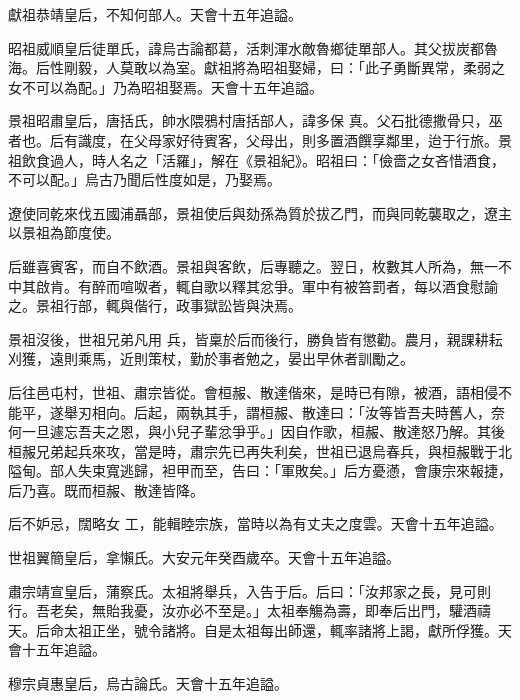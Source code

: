 \begin{pinyinscope}
 獻祖恭靖皇后，不知何部人。天會十五年追謚。



 昭祖威順皇后徒單氏，諱烏古論都葛，活刺渾水敵魯鄉徒單部人。其父拔炭都魯海。后性剛毅，人莫敢以為室。獻祖將為昭祖娶婦，曰：「此子勇斷異常，柔弱之女不可以為配。」乃為昭祖娶焉。天會十五年追謚。



 景祖昭肅皇后，唐括氏，帥水隈鴉村唐括部人，諱多保
 真。父石批德撒骨只，巫者也。后有識度，在父母家好待賓客，父母出，則多置酒饌享鄰里，迨于行旅。景祖飲食過人，時人名之「活羅」，解在《景祖紀》。昭祖曰：「儉嗇之女吝惜酒食，不可以配。」烏古乃聞后性度如是，乃娶焉。



 遼使同乾來伐五國浦聶部，景祖使后與劾孫為質於拔乙門，而與同乾襲取之，遼主以景祖為節度使。



 后雖喜賓客，而自不飲酒。景祖與客飲，后專聽之。翌日，枚數其人所為，無一不中其啟肯。有醉而喧呶者，輒自歌以釋其忿爭。軍中有被笞罰者，每以酒食慰諭之。景祖行部，輒與偕行，政事獄訟皆與決焉。



 景祖沒後，世祖兄弟凡用
 兵，皆稟於后而後行，勝負皆有懲勸。農月，親課耕耘刈獲，遠則乘馬，近則策杖，勤於事者勉之，晏出早休者訓勵之。



 后往邑屯村，世祖、肅宗皆從。會桓赧、散達偕來，是時已有隙，被酒，語相侵不能平，遂舉刃相向。后起，兩執其手，謂桓赧、散達曰：「汝等皆吾夫時舊人，奈何一旦遽忘吾夫之恩，與小兒子輩忿爭乎。」因自作歌，桓赧、散達怒乃解。其後桓赧兄弟起兵來攻，當是時，肅宗先已再失利矣，世祖已退烏春兵，與桓赧戰于北隘甸。部人失束寬逃歸，袒甲而至，告曰：「軍敗矣。」后方憂懣，會康宗來報捷，后乃喜。既而桓赧、散達皆降。



 后不妒忌，闊略女
 工，能輯睦宗族，當時以為有丈夫之度雲。天會十五年追謚。



 世祖翼簡皇后，拿懶氏。大安元年癸酉歲卒。天會十五年追謚。



 肅宗靖宣皇后，蒲察氏。太祖將舉兵，入告于后。后曰：「汝邦家之長，見可則行。吾老矣，無貽我憂，汝亦必不至是。」太祖奉觴為壽，即奉后出門，驩酒禱天。后命太祖正坐，號令諸將。自是太祖每出師還，輒率諸將上謁，獻所俘獲。天會十五年追謚。



 穆宗貞惠皇后，烏古論氏。天會十五年追謚。




\end{pinyinscope}
